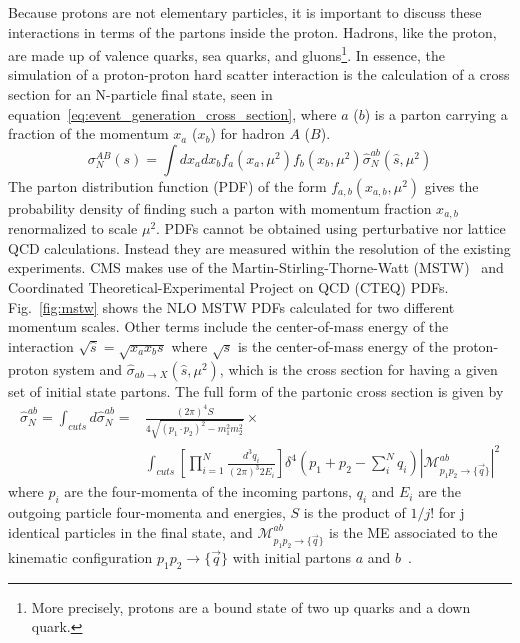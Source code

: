 Because protons are not elementary particles, it is important to discuss these interactions in terms of the partons inside the proton.
Hadrons, like the proton, are made up of valence quarks, sea quarks, and gluons\footnote{More precisely, protons are a bound state of two up quarks and a down quark.}.
In essence, the simulation of a proton-proton hard scatter interaction is the calculation of a cross section for an N-particle final state, seen in equation~\ref{eq:event_generation_cross_section}, where $a$ ($b$) is a parton carrying a fraction of the momentum $x_{a}$ ($x_{b}$) for hadron $A$ ($B$).
\begin{equation}
\label{eq:event_generation_cross_section}
\sigma_{N}^{AB}\left(s\right)=\int dx_{a}dx_{b}f_{a}\left(x_{a},\mu^{2}\right)f_{b}\left(x_{b},\mu^{2}\right)\hat{\sigma}_{N}^{ab}\left(\hat{s},\mu^{2}\right)
\end{equation}
The parton distribution function (PDF) of the form $f_{a,b}\left(x_{a,b},\mu^{2}\right)$ gives the probability density of finding such a parton with momentum fraction $x_{a,b}$ renormalized to scale $\mu^{2}$.
PDFs cannot be obtained using perturbative nor lattice QCD calculations.
Instead they are measured within the resolution of the existing experiments.
CMS makes use of the Martin-Stirling-Thorne-Watt (MSTW)~\cite{Martin:2009iq} and Coordinated Theoretical-Experimental Project on QCD (CTEQ) PDFs.
Fig.~\ref{fig:mstw} shows the NLO MSTW PDFs calculated for two different momentum scales.
Other terms include the center-of-mass energy of the interaction $\sqrt{\hat{s}}=\sqrt{x_{a}x_{b}s}$ where $\sqrt{s}$ is the center-of-mass energy of the proton-proton system and $\hat{\sigma}_{ab\rightarrow{X}}\left(\hat{s},\mu^{2}\right)$, which is the cross section for having a given set of initial state partons. The full form of the partonic cross section is given by 
\begin{equation}
\begin{split}\label{eq:event_generation_partonic_cross_section}
\hat{\sigma}_{N}^{ab}=\int_{cuts}d\hat{\sigma}_{N}^{ab}={}&\frac{\left(2\pi\right)^{4}S}{4\sqrt{\left(p_{1}{\cdot}p_{2}\right)^{2}-m_{1}^{2}m_{2}^{2}}}\times \\ &\int_{cuts} \left[\prod_{i=1}^{N}\frac{d^{3}q_{i}}{\left(2\pi\right)^{3}2E_{i}}\right]\delta^{4}\left(p_{1}+p_{2}-\sum_{i}^{N}q_{i}\right)|\mathcal{M}_{p_{1}p_{2}\rightarrow\{\vec{q}\}}^{ab}|^{2}
\end{split}
\end{equation}
where $p_{i}$ are the four-momenta of the incoming partons, $q_{i}$ and $E_{i}$ are the outgoing particle four-momenta and energies, $S$ is the product of $1/j!$ for j identical particles in the final state, and $\mathcal{M}_{p_{1}p_{2}\rightarrow\{\vec{q}\}}^{ab}$ is the ME associated to the kinematic configuration $p_{1}p_{2}\rightarrow\{\vec{q}\}$ with initial partons $a$ and $b$~\cite{Siegert:2010cru,Griffiths2008}.
